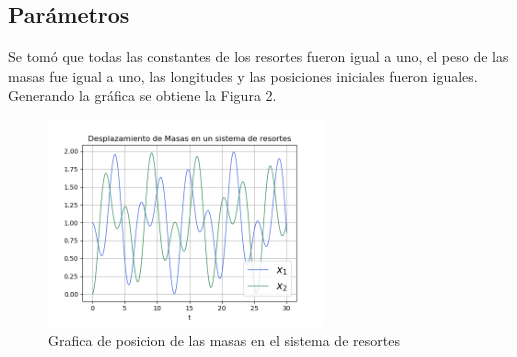 \documentclass[11pt, spanish]{report}
\begin{document}
\subsection{Parámetros}
Se tomó que todas las constantes de los resortes fueron igual a uno, el peso de las masas fue igual a uno, las longitudes y las posiciones iniciales fueron iguales. \\
Generando la gráfica se obtiene la Figura 2.
\begin{figure}[ht]
\caption{Grafica de posicion de las masas en el sistema de resortes}
\centering
\includegraphics[width=0.65\textwidth]{imagen.png}
\end{figure}
\end{document}
